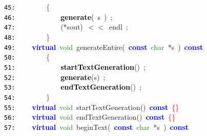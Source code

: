\documentclass{article}
\begin{document}
\mbox{}\texttt{\textcolor{Black}{45:}} \ \ \ \ \ \ \ \ \textcolor{Red}{\{}\  \\
\mbox{}\texttt{\textcolor{Black}{46:}} \ \ \ \ \ \ \ \ \ \ \ \ \textbf{\textcolor{Black}{generate}}\textcolor{BrickRed}{(}\ s\ \textcolor{BrickRed}{)}\ \textcolor{BrickRed}{;} \\
\mbox{}\texttt{\textcolor{Black}{47:}} \ \ \ \ \ \ \ \ \ \ \ \ \textcolor{BrickRed}{(*}sout\textcolor{BrickRed}{)}\ \textcolor{BrickRed}{$<$$<$}\ endl\ \textcolor{BrickRed}{;}\  \\
\mbox{}\texttt{\textcolor{Black}{48:}} \ \ \ \ \ \ \ \ \textcolor{Red}{\}} \\
\mbox{}\texttt{\textcolor{Black}{49:}} \ \ \ \ \textbf{\textcolor{Blue}{virtual}}\ \textcolor{ForestGreen}{void}\ \label{test.h:49}generateEntire\textcolor{BrickRed}{(}\ \textbf{\textcolor{Blue}{const}}\ \textcolor{ForestGreen}{char}\ \textcolor{BrickRed}{*}s\ \textcolor{BrickRed}{)}\ \textbf{\textcolor{Blue}{const}} \\
\mbox{}\texttt{\textcolor{Black}{50:}} \ \ \ \ \ \ \ \ \textcolor{Red}{\{} \\
\mbox{}\texttt{\textcolor{Black}{51:}} \ \ \ \ \ \ \ \ \ \ \ \ \textbf{\textcolor{Black}{startTextGeneration}}\textcolor{BrickRed}{()}\ \textcolor{BrickRed}{;} \\
\mbox{}\texttt{\textcolor{Black}{52:}} \ \ \ \ \ \ \ \ \ \ \ \ \textbf{\textcolor{Black}{generate}}\textcolor{BrickRed}{(}s\textcolor{BrickRed}{)}\ \textcolor{BrickRed}{;} \\
\mbox{}\texttt{\textcolor{Black}{53:}} \ \ \ \ \ \ \ \ \ \ \ \ \textbf{\textcolor{Black}{endTextGeneration}}\textcolor{BrickRed}{()}\ \textcolor{BrickRed}{;} \\
\mbox{}\texttt{\textcolor{Black}{54:}} \ \ \ \ \ \ \ \ \textcolor{Red}{\}} \\
\mbox{}\texttt{\textcolor{Black}{55:}} \ \ \ \ \textbf{\textcolor{Blue}{virtual}}\ \textcolor{ForestGreen}{void}\ \label{test.h:55}startTextGeneration\textcolor{BrickRed}{()}\ \textbf{\textcolor{Blue}{const}}\ \textcolor{Red}{\{\}} \\
\mbox{}\texttt{\textcolor{Black}{56:}} \ \ \ \ \textbf{\textcolor{Blue}{virtual}}\ \textcolor{ForestGreen}{void}\ \label{test.h:56}endTextGeneration\textcolor{BrickRed}{()}\ \textbf{\textcolor{Blue}{const}}\ \textcolor{Red}{\{\}} \\
\mbox{}\texttt{\textcolor{Black}{57:}} \ \ \ \ \textbf{\textcolor{Blue}{virtual}}\ \textcolor{ForestGreen}{void}\ \label{test.h:57}beginText\textcolor{BrickRed}{(}\ \textbf{\textcolor{Blue}{const}}\ \textcolor{ForestGreen}{char}\ \textcolor{BrickRed}{*}s\ \textcolor{BrickRed}{)}\ \textbf{\textcolor{Blue}{const}} \\
\end{document}
